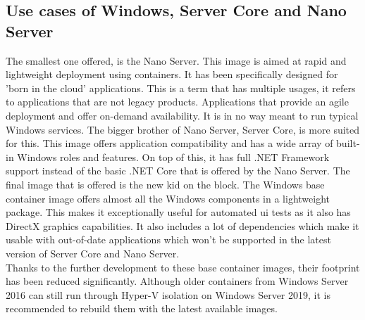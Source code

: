 \subsection{Use cases of Windows, Server Core and Nano Server}
The smallest one offered, is the Nano Server. 
This image is aimed at rapid and lightweight deployment using containers. 
It has been specifically designed for 'born in the cloud' applications. 
This is a term that has multiple usages, it refers to applications that are not legacy products. 
Applications that provide an agile deployment and offer on-demand availability. 
It is in no way meant to run typical Windows services. 
The bigger brother of Nano Server, Server Core, is more suited for this. 
This image offers application compatibility and has a wide array of built-in Windows roles and features. 
On top of this, it has full .NET Framework support instead of the basic .NET Core that is offered by the Nano Server. 
The final image that is offered is the new kid on the block. 
The Windows base container image offers almost all the Windows components in a lightweight package. 
This makes it exceptionally useful for automated \acrshort{ui} tests as it also has DirectX graphics capabilities. 
It also includes a lot of dependencies which make it usable with out-of-date applications which won't be supported in the latest version of Server Core and Nano Server. 
\\
Thanks to the further development to these base container images, their footprint has been reduced significantly. 
Although older containers from Windows Server 2016 can still run through Hyper-V isolation on Windows Server 2019, it is recommended to rebuild them with the latest available images.





